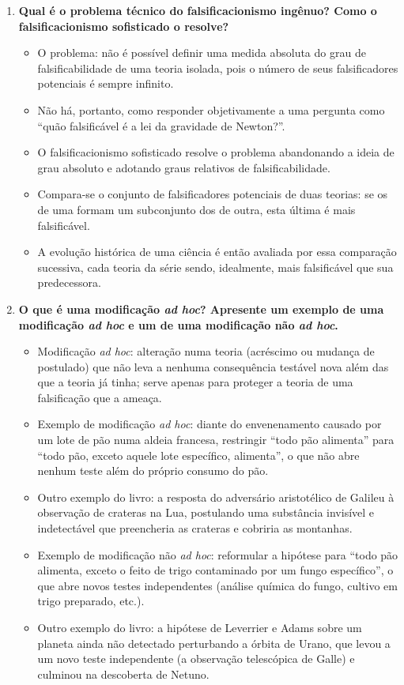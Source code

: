 \documentclass[10pt,a4paper]{extarticle}
\begin{document}
\begin{enumerate}[resume, label=\textbf{\arabic*.}, itemsep=10pt]
\item \textbf{Qual é o problema técnico do falsificacionismo ingênuo? Como o falsificacionismo sofisticado o resolve?}
\begin{itemize}
  \item O problema: não é possível definir uma medida absoluta do grau de falsificabilidade de uma teoria isolada, pois o número de seus falsificadores potenciais é sempre infinito.
  \item Não há, portanto, como responder objetivamente a uma pergunta como \enquote{quão falsificável é a lei da gravidade de Newton?}.
  \item O falsificacionismo sofisticado resolve o problema abandonando a ideia de grau absoluto e adotando graus relativos de falsificabilidade.
  \item Compara-se o conjunto de falsificadores potenciais de duas teorias: se os de uma formam um subconjunto dos de outra, esta última é mais falsificável.
  \item A evolução histórica de uma ciência é então avaliada por essa comparação sucessiva, cada teoria da série sendo, idealmente, mais falsificável que sua predecessora.
\end{itemize}

\item \textbf{O que é uma modificação \emph{ad hoc}? Apresente um exemplo de uma modificação \emph{ad hoc} e um de uma modificação não \emph{ad hoc}.}
\begin{itemize}
  \item Modificação \emph{ad hoc}: alteração numa teoria (acréscimo ou mudança de postulado) que não leva a nenhuma consequência testável nova além das que a teoria já tinha; serve apenas para proteger a teoria de uma falsificação que a ameaça.
  \item Exemplo de modificação \emph{ad hoc}: diante do envenenamento causado por um lote de pão numa aldeia francesa, restringir \enquote{todo pão alimenta} para \enquote{todo pão, exceto aquele lote específico, alimenta}, o que não abre nenhum teste além do próprio consumo do pão.
  \item Outro exemplo do livro: a resposta do adversário aristotélico de Galileu à observação de crateras na Lua, postulando uma substância invisível e indetectável que preencheria as crateras e cobriria as montanhas.
  \item Exemplo de modificação não \emph{ad hoc}: reformular a hipótese para \enquote{todo pão alimenta, exceto o feito de trigo contaminado por um fungo específico}, o que abre novos testes independentes (análise química do fungo, cultivo em trigo preparado, etc.).
  \item Outro exemplo do livro: a hipótese de Leverrier e Adams sobre um planeta ainda não detectado perturbando a órbita de Urano, que levou a um novo teste independente (a observação telescópica de Galle) e culminou na descoberta de Netuno.
\end{itemize}


\end{enumerate}
\end{document}
